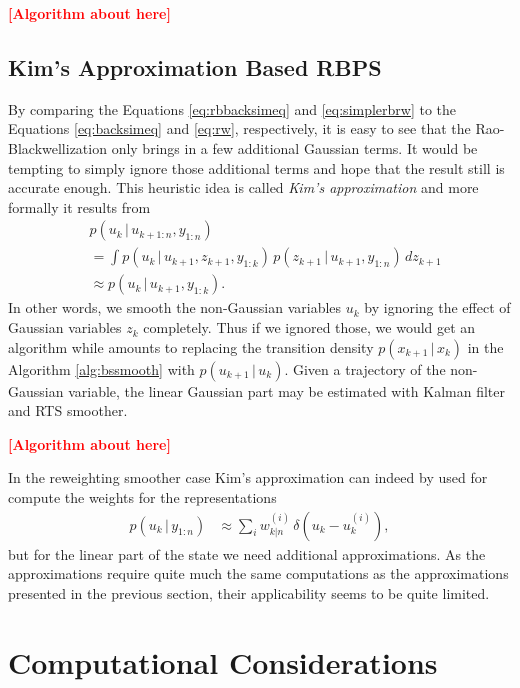 \documentclass[twocolumn]{autart}    %
\newcommand{\comment}[1]{\textcolor{red}{\textbf{[#1]}}}
\begin{document}
\comment{Algorithm about here}

\subsection{Kim's Approximation Based RBPS}
%
By comparing the Equations \eqref{eq:rbbacksimeq} and
\eqref{eq:simplerbrw} to the Equations \eqref{eq:backsimeq} and
\eqref{eq:rw}, respectively, it is easy to see that the
Rao-Blackwellization only brings in a few additional Gaussian
terms. It would be tempting to simply ignore those additional
terms and hope that the result still is accurate enough.
This heuristic idea is called {\em Kim's approximation}
\cite{Kim:1994,Barber:2006} and more formally it results from
%
\begin{equation}
\begin{split}
 &p(u_{k} \,|\, u_{k+1:n},y_{1:n}) \\
 &= \int p(u_{k} \,|\, u_{k+1},z_{k+1},y_{1:k}) \,
         p(z_{k+1} \,|\, u_{k+1},y_{1:n}) \, dz_{k+1} \\
  &\approx p(u_{k} \,|\, u_{k+1},y_{1:k}).
\end{split}
\end{equation}
%
In other words, we smooth the non-Gaussian variables $u_k$ by ignoring
the effect of Gaussian variables $z_k$ completely. Thus if we ignored
those, we would get an algorithm while amounts to replacing the
transition density $p(x_{k+1}\,|\,x_{k})$ in the Algorithm
\ref{alg:bssmooth} with $p(u_{k+1}\,|\,u_{k})$. Given a trajectory of
the non-Gaussian variable, the linear Gaussian part may be estimated
with Kalman filter and RTS smoother.

\comment{Algorithm about here}

In the reweighting smoother case Kim's approximation can indeed by
used for compute the weights for the representations
%
\begin{equation}
\begin{split}
  p(u_{k}\,|\,y_{1:n}) 
  &\approx \sum_{i} w^{(i)}_{k|n} \, \delta(u_{k} - u_{k}^{(i)}),
\end{split}
\end{equation}
%
but for the linear part of the state we need additional
approximations. As the approximations require quite much the same
computations as the approximations presented in the previous section,
their applicability seems to be quite limited.


\section{Computational Considerations}
\end{document}
